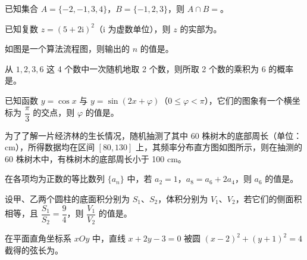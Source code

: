 \begin{question}
已知集合 $A=\{-2,-1,3,4\}$，$B=\{-1,2,3\}$，则 $A\cap B=$\gkblank{}。

\end{question}
\begin{question}
已知复数 $z=(5+2\mathrm i)^2$（$\mathrm i$ 为虚数单位），则 $z$ 的实部为\gkblank{}。

\Needspace{0.4\textheight}
\end{question}
\begin{question}
如图是一个算法流程图，则输出的 $n$ 的值是\gkblank{}。
\nopagebreak[4]
\begin{center}\end{center}
\nopagebreak[4]
\end{question}
\begin{question}
从 $1,2,3,6$ 这 4 个数中一次随机地取 2 个数，则所取 2 个数的乘积为 6 的概率是\gkblank{}。

\end{question}
\begin{question}
已知函数 $y=\cos x$ 与 $y=\sin(2x+\varphi)$（$0\leqslant\varphi<\pi$），它们的图象有一个横坐标为 $\dfrac\pi3$ 的交点，则 $\varphi$ 的值是\gkblank{}。

\Needspace{0.4\textheight}
\end{question}
\begin{question}
为了了解一片经济林的生长情况，随机抽测了其中 60 株树木的底部周长（单位：cm），所得数据均在区间 $[80,130]$ 上，其频率分布直方图如图所示，则在抽测的 60 株树木中，有\gkblank{}株树木的底部周长小于 100 cm。
\nopagebreak[4]
\begin{center}\end{center}
\nopagebreak[4]
\end{question}
\begin{question}
在各项均为正数的等比数列 $\{a_n\}$ 中，若 $a_2=1$，$a_8=a_6+2a_4$，则 $a_6$ 的值是\gkblank{}。

\end{question}
\begin{question}
设甲、乙两个圆柱的底面积分别为 $S_1$、$S_2$，体积分别为 $V_1$、$V_2$，若它们的侧面积相等，且 $\dfrac{S_1}{S_2}=\dfrac94$，则 $\dfrac{V_1}{V_2}$ 的值是\gkblank{}。

\end{question}
\begin{question}
在平面直角坐标系 $xOy$ 中，直线 $x+2y-3=0$ 被圆 $(x-2)^2+(y+1)^2=4$ 截得的弦长为\gkblank{}。

\end{question}
